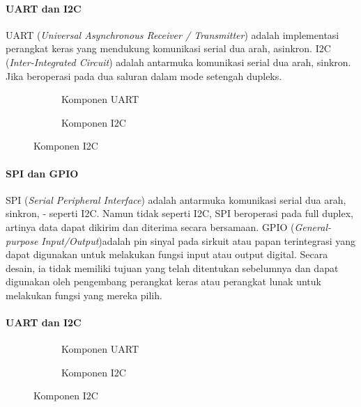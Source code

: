 \begin{frame}{\insertsectionhead}
	\framesubtitle{UART dan I2C}
	\justifying
	UART (\textit{Universal Asynchronous Receiver / Transmitter}) adalah implementasi perangkat keras yang mendukung komunikasi serial dua arah, asinkron.
	\vfill
	I2C (\textit{Inter-Integrated Circuit}) adalah antarmuka komunikasi serial dua arah, sinkron. Jika beroperasi pada dua saluran dalam mode setengah dupleks.
		\begin{figure}[ht!]
		\begin{subfigure}[b]{0.25\textwidth}
			\caption*{Komponen UART}
		\end{subfigure}
		\hspace{50pt}
		\begin{subfigure}[b]{0.25\textwidth}
			\caption*{Komponen I2C}
		\end{subfigure}
	\end{figure}
\end{frame}

\begin{frame}{\insertsectionhead}
	\framesubtitle{SPI dan GPIO}
	\justifying
	SPI (\textit{Serial Peripheral Interface}) adalah antarmuka komunikasi serial dua arah, sinkron, - seperti I2C. Namun tidak seperti I2C, SPI beroperasi pada full duplex, artinya data dapat dikirim dan diterima secara bersamaan.
	\vfill
	GPIO (\textit{General-purpose Input/Output})adalah pin sinyal pada sirkuit atau papan terintegrasi yang dapat digunakan untuk melakukan fungsi input atau output digital. Secara desain, ia tidak memiliki tujuan yang telah ditentukan sebelumnya dan dapat digunakan oleh pengembang perangkat keras atau perangkat lunak untuk melakukan fungsi yang mereka pilih.
\end{frame}

\begin{frame}{\insertsectionhead}
	\framesubtitle{UART dan I2C}
	\justifying
	\begin{figure}[ht!]
		\begin{subfigure}[b]{0.25\textwidth}
			\caption*{Komponen UART}
		\end{subfigure}
		\hspace{50pt}
		\begin{subfigure}[b]{0.25\textwidth}
			\caption*{Komponen I2C}
		\end{subfigure}
	\end{figure}
\end{frame}

